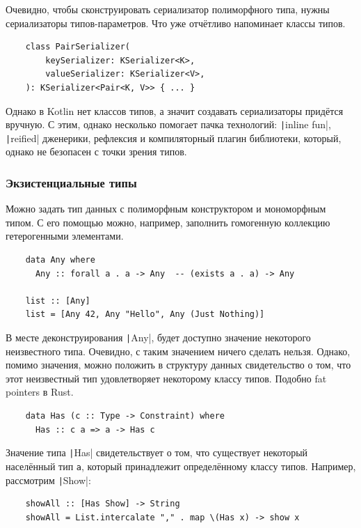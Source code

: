 Очевидно, чтобы сконструировать сериализатор полиморфного типа, нужны сериализаторы типов-параметров.
Что уже отчётливо напоминает классы типов.
\begin{verbatim}
    class PairSerializer(
        keySerializer: KSerializer<K>,
        valueSerializer: KSerializer<V>,
    ): KSerializer<Pair<K, V>> { ... }
\end{verbatim}

Однако в Kotlin нет классов типов, а значит создавать сериализаторы придётся вручную.
С этим, однако несколько помогает пачка технологий: \texttt|inline fun|, \texttt|reified| дженерики, рефлексия и компиляторный плагин библиотеки, который, однако не безопасен с точки зрения типов.

\subsubsection{Экзистенциальные типы} \label{subsubsec:existentials}

Можно задать тип данных с полиморфным конструктором и мономорфным типом.
С его помощью можно, например, заполнить гомогенную коллекцию гетерогенными элементами.
\begin{verbatim}
    data Any where
      Any :: forall a . a -> Any  -- (exists a . a) -> Any

    list :: [Any]
    list = [Any 42, Any "Hello", Any (Just Nothing)]
\end{verbatim}

В месте деконструирования \texttt|Any|, будет доступно значение некоторого неизвестного типа.
Очевидно, с таким значением ничего сделать нельзя.
Однако, помимо значения, можно положить в структуру данных свидетельство о том, что этот неизвестный тип удовлетворяет некоторому классу типов.
Подобно fat pointers в Rust.
\begin{verbatim}
    data Has (c :: Type -> Constraint) where
      Has :: c a => a -> Has c
\end{verbatim}

Значение типа \texttt|Has| свидетельствует о том, что существует некоторый населённый тип \texttt{a}, который принадлежит определённому классу типов.
Например, рассмотрим \texttt|Show|:
\begin{verbatim}
    showAll :: [Has Show] -> String
    showAll = List.intercalate "," . map \(Has x) -> show x
\end{verbatim}

